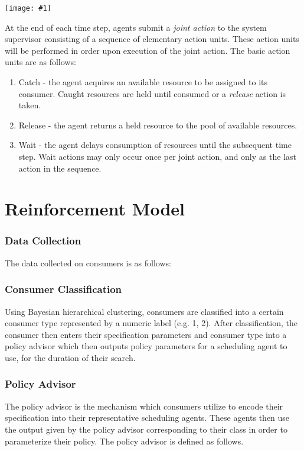 \documentclass{article}
\theoremstyle{definition}
\theoremstyle{remark}
\newcommand{\addpic}[1]{\texttt{[image: \#1]}}
\begin{document}
	\addpic{figures/Joint-action.jpg}

	
	
	At the end of each time step, agents submit a \emph{joint action} to the system supervisor consisting of a sequence of elementary action units. These action units will be performed in order upon execution of the joint action. The basic action units are as follows:
	
	\begin{enumerate}
		\item Catch - the agent acquires an available resource to be assigned to its consumer. Caught resources are held until consumed or a \emph{release} action is taken.
		\item Release - the agent returns a held resource to the pool of available resources.
		\item Wait - the agent delays consumption of resources until the subsequent time step. Wait actions may only occur once per joint action, and only as the last action in the sequence.
	\end{enumerate}

	
	\newpage
	
\part{Reinforcement Model}

	\section{Data Collection}

	The data collected on consumers is as follows:
	\begin{table}

	\end{table}

	\section{Consumer Classification}
	Using Bayesian hierarchical clustering, consumers are classified into a certain consumer type represented by a
    numeric label (e.g. 1, 2). After classification, the consumer then enters their specification parameters and
    consumer type into a policy advisor which then outputs policy parameters for a scheduling agent to use, for
    the duration of their search.
	
	\section{Policy Advisor}
	The policy advisor is the mechanism which consumers utilize to encode their specification into their
    representative scheduling agents. These agents then use the output given by the policy advisor corresponding
    to their class in order to parameterize their policy. The policy advisor is defined as follows.
\end{document}
